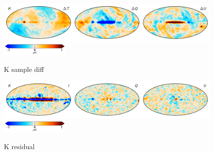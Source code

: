 \documentclass[twocolumn]{../../common/aa}
\begin{document}
\begin{figure}[t]
	\centering
	\includegraphics[width=\textwidth]{figures/023-WMAP_K_sampdiff.pdf}\\
	\includegraphics[width=0.30\textwidth]{figures/cbar_3uK.pdf}        
	\caption{K sample diff}
        \label{fig:Ksampdiff}
\end{figure}

\begin{figure}[t]
	\centering
	\includegraphics[width=\textwidth]{figures/res_K_IQU.pdf}\\
	\includegraphics[width=0.30\textwidth]{figures/cbar_5uK.pdf}        
	\caption{K residual}
        \label{fig:Kres}
\end{figure}
\end{document}
